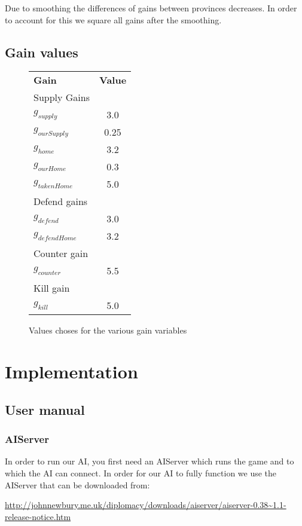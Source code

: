 \documentclass[a4paper]{article} %
\begin{document}
Due to smoothing the differences of gains between provinces decreases. In order to account for this we square all gains after the smoothing. 



\subsection{Gain values}




\begin{figure}[H]
\centering
\begin{tabular}{| l | c |}
  \hline            
  {\bf Gain} & {\bf Value}\\
  {Supply Gains} &  \\
  $g_{supply}$ & 3.0 \\
  $g_{ourSupply}$ & 0.25 \\
  $g_{home}$ & 3.2 \\
  $g_{ourHome}$ & 0.3 \\
  $g_{takenHome}$ & 5.0 \\
  {Defend gains} &  \\
  $g_{defend}$ &  3.0 \\
  $g_{defendHome}$ & 3.2 \\
  {Counter gain} & \\
  $g_{counter}$ & 5.5 \\
  {Kill gain} & \\
  $g_{kill}$ & 5.0 \\
  \hline  
\end{tabular}
\caption{Values choses for the various gain variables}
\end{figure}


\section{Implementation}
\subsection{User manual}

\subsubsection{AIServer}
In order to run our AI, you first need an AIServer which runs the game and to which the AI can connect. In order for our AI to fully function we use the AIServer that can be downloaded from: 

\begin{sloppypar}
\noindent\url{http://johnnewbury.me.uk/diplomacy/downloads/aiserver/aiserver-0.38~1.1-release-notice.htm}
\end{sloppypar}
\end{document}
